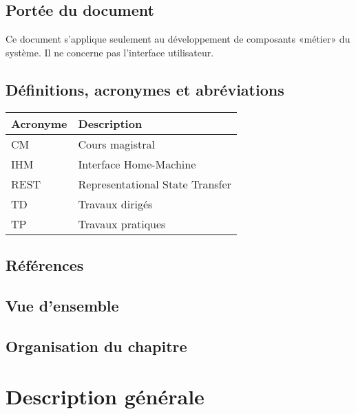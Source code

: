 \subsection{Portée du document}
Ce document s’applique seulement au développement de composants «métier» du système. Il ne concerne pas l’interface utilisateur.

\subsection{Définitions, acronymes et abréviations}


\begin{tabular}{ll}
\toprule
Acronyme & Description \\
\midrule
CM 			& Cours magistral\\
IHM 		& Interface Home-Machine\\
REST 		& Representational State Transfer\\
TD			& Travaux dirigés\\
TP			& Travaux pratiques\\
\bottomrule
\end{tabular}

\subsection{Références}

\subsection{Vue d’ensemble} 

\subsection{Organisation du chapitre}

\section{Description générale}

